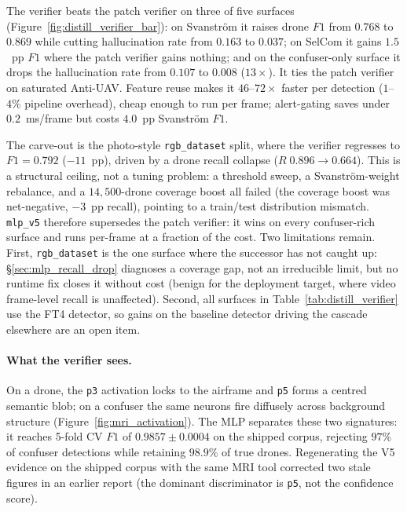 The verifier beats the patch verifier on three of five surfaces (Figure~\ref{fig:distill_verifier_bar}): on Svanstr\"om it raises drone $F1$ from $0.768$ to $0.869$ while cutting hallucination rate from $0.163$ to $0.037$; on SelCom it gains $1.5$~pp $F1$ where the patch verifier gains nothing; and on the confuser-only surface it drops the hallucination rate from $0.107$ to $0.008$ ($13\times$). It ties the patch verifier on saturated Anti-UAV. Feature reuse makes it $46$--$72\times$ faster per detection ($1$--$4\%$ pipeline overhead), cheap enough to run per frame; alert-gating saves under $0.2$~ms/frame but costs $4.0$~pp Svanstr\"om $F1$.

The carve-out is the photo-style \texttt{rgb\_dataset} split, where the verifier regresses to $F1=0.792$ ($-11$~pp), driven by a drone recall collapse ($R\;0.896 \to 0.664$). This is a structural ceiling, not a tuning problem: a threshold sweep, a Svanstr\"om-weight rebalance, and a $14{,}500$-drone coverage boost all failed (the coverage boost was net-negative, $-3$~pp recall), pointing to a train/test distribution mismatch. \texttt{mlp\_v5} therefore supersedes the patch verifier: it wins on every confuser-rich surface and runs per-frame at a fraction of the cost. Two limitations remain. First, \texttt{rgb\_dataset} is the one surface where the successor has not caught up: \S\ref{sec:mlp_recall_drop} diagnoses a coverage gap, not an irreducible limit, but no runtime fix closes it without cost (benign for the deployment target, where video frame-level recall is unaffected). Second, all surfaces in Table~\ref{tab:distill_verifier} use the FT4 detector, so gains on the baseline detector driving the cascade elsewhere are an open item.

\paragraph{What the verifier sees.}
On a drone, the \texttt{p3} activation locks to the airframe and \texttt{p5} forms a centred semantic blob; on a confuser the same neurons fire diffusely across background structure (Figure~\ref{fig:mri_activation}). The MLP separates these two signatures: it reaches 5-fold CV $F1$ of $0.9857\pm0.0004$ on the shipped corpus, rejecting $97\%$ of confuser detections while retaining $98.9\%$ of true drones. Regenerating the V5 evidence on the shipped corpus with the same MRI tool corrected two stale figures in an earlier report (the dominant discriminator is \texttt{p5}, not the confidence score).

